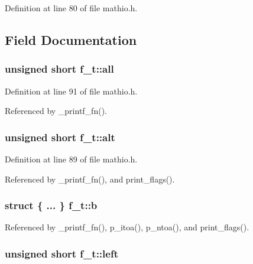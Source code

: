 Definition at line 80 of file mathio.\+h.



\subsection{Field Documentation}
\subsubsection[{\texorpdfstring{all}{all}}]{\setlength{\rightskip}{0pt plus 5cm}unsigned short f\+\_\+t\+::all}\hypertarget{unionf__t_aab0615c9ada80b0f986b58639ea8c480}{}\label{unionf__t_aab0615c9ada80b0f986b58639ea8c480}


Definition at line 91 of file mathio.\+h.



Referenced by \+\_\+printf\+\_\+fn().

\subsubsection[{\texorpdfstring{alt}{alt}}]{\setlength{\rightskip}{0pt plus 5cm}unsigned short f\+\_\+t\+::alt}\hypertarget{unionf__t_a907a8d8af4803c9a18bc0586d22d6881}{}\label{unionf__t_a907a8d8af4803c9a18bc0586d22d6881}


Definition at line 89 of file mathio.\+h.



Referenced by \+\_\+printf\+\_\+fn(), and print\+\_\+flags().

\subsubsection[{\texorpdfstring{b}{b}}]{\setlength{\rightskip}{0pt plus 5cm}struct \{ ... \}   f\+\_\+t\+::b}\hypertarget{unionf__t_a37c0016009ff1f7ab1ef6697d9024a19}{}\label{unionf__t_a37c0016009ff1f7ab1ef6697d9024a19}


Referenced by \+\_\+printf\+\_\+fn(), p\+\_\+itoa(), p\+\_\+ntoa(), and print\+\_\+flags().

\subsubsection[{\texorpdfstring{left}{left}}]{\setlength{\rightskip}{0pt plus 5cm}unsigned short f\+\_\+t\+::left}\hypertarget{unionf__t_a5f89cd6194ccc6a288f1fe31d39b2e64}{}\label{unionf__t_a5f89cd6194ccc6a288f1fe31d39b2e64}


